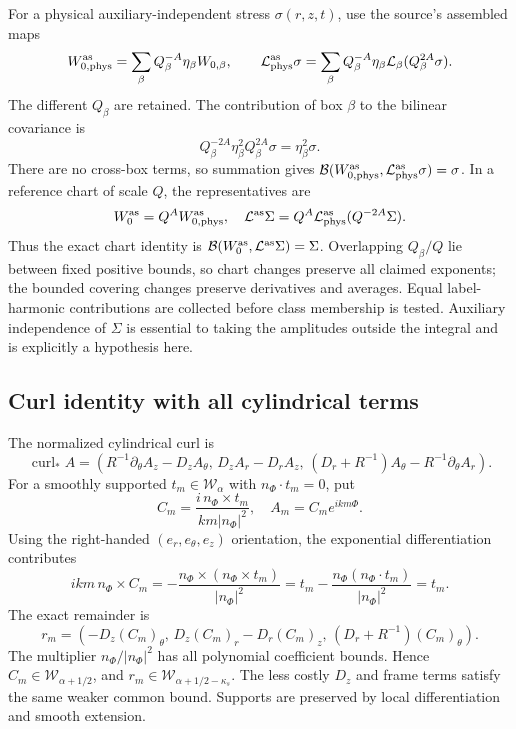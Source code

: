 \documentclass[10pt,a4paper]{article}
\begin{document}
For a physical auxiliary-independent stress \(\sigma(r,z,t)\), use the source's assembled maps \[
W_{0,\rm phys}^{\rm as}
=\sum_\beta Q_\beta^{-A}\eta_\beta W_{0,\beta},\qquad
\mathcal L_{\rm phys}^{\rm as}\sigma
=\sum_\beta Q_\beta^{-A}\eta_\beta
\mathcal L_\beta(Q_\beta^{2A}\sigma).
\] The different \(Q_\beta\) are retained. The contribution of box \(\beta\) to the bilinear covariance is \[
Q_\beta^{-2A}\eta_\beta^2Q_\beta^{2A}\sigma
=\eta_\beta^2\sigma.
\] There are no cross-box terms, so summation gives \(\mathcal B(W_{0,\rm phys}^{\rm as},\mathcal L_{\rm phys}^{\rm as}\sigma)=\sigma\). In a reference chart of scale \(Q\), the representatives are \[
W_0^{\rm as}=Q^AW_{0,\rm phys}^{\rm as},\quad
\mathcal L^{\rm as}\Sigma=Q^A\mathcal L_{\rm phys}^{\rm as}(Q^{-2A}\Sigma).
\] Thus the exact chart identity is \(\mathcal B(W_0^{\rm as},\mathcal L^{\rm as}\Sigma)=\Sigma\). Overlapping \(Q_\beta/Q\) lie between fixed positive bounds, so chart changes preserve all claimed exponents; the bounded covering changes preserve derivatives and averages. Equal label-harmonic contributions are collected before class membership is tested. Auxiliary independence of \(\Sigma\) is essential to taking the amplitudes outside the integral and is explicitly a hypothesis here.

\subsection{Curl identity with all cylindrical terms}\label{curl-identity-with-all-cylindrical-terms}

The normalized cylindrical curl is \[
\operatorname{curl}_*A=
\left(R^{-1}\partial_\theta A_z-D_zA_\theta,\,
D_zA_r-D_rA_z,\,
(D_r+R^{-1})A_\theta-R^{-1}\partial_\theta A_r\right).
\] For a smoothly supported \(t_m\in\mathcal W_\alpha\) with \(n_\Phi\cdot t_m=0\), put \[
C_m=\frac{i\,n_\Phi\times t_m}{km|n_\Phi|^2},
\quad A_m=C_me^{ikm\Phi}.
\] Using the right-handed \((e_r,e_\theta,e_z)\) orientation, the exponential differentiation contributes \[
ikm\,n_\Phi\times C_m
=-\frac{n_\Phi\times(n_\Phi\times t_m)}{|n_\Phi|^2}
=t_m-\frac{n_\Phi(n_\Phi\cdot t_m)}{|n_\Phi|^2}=t_m.
\] The exact remainder is \[
r_m=\left(-D_z(C_m)_\theta,\,
D_z(C_m)_r-D_r(C_m)_z,\,
(D_r+R^{-1})(C_m)_\theta\right).
\] The multiplier \(n_\Phi/|n_\Phi|^2\) has all polynomial coefficient bounds. Hence \(C_m\in\mathcal W_{\alpha+1/2}\), and \(r_m\in\mathcal W_{\alpha+1/2-\kappa_s}\). The less costly \(D_z\) and frame terms satisfy the same weaker common bound. Supports are preserved by local differentiation and smooth extension.
\end{document}
